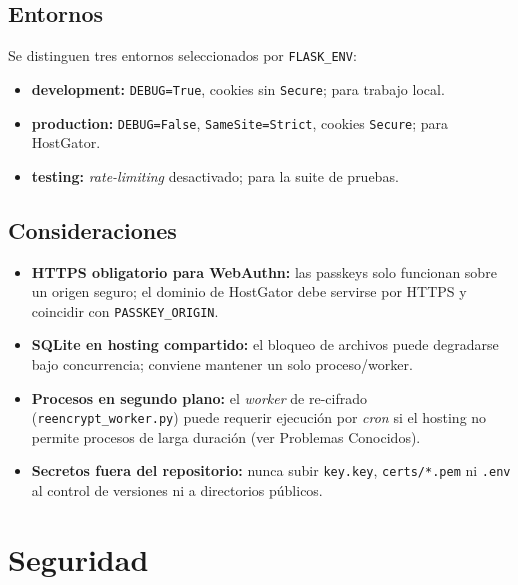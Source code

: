 \documentclass[10pt,letterpaper]{report}
\begin{document}
\section{Entornos}
Se distinguen tres entornos seleccionados por \texttt{FLASK\_ENV}:
\begin{itemize}
  \item \textbf{development:} \texttt{DEBUG=True}, cookies sin \texttt{Secure}; para trabajo local.
  \item \textbf{production:} \texttt{DEBUG=False}, \texttt{SameSite=Strict}, cookies \texttt{Secure};
  para HostGator.
  \item \textbf{testing:} \emph{rate-limiting} desactivado; para la suite de pruebas.
\end{itemize}

\section{Consideraciones}
\begin{itemize}
  \item \textbf{HTTPS obligatorio para WebAuthn:} las passkeys solo funcionan sobre un origen seguro;
  el dominio de HostGator debe servirse por HTTPS y coincidir con \texttt{PASSKEY\_ORIGIN}.
  \item \textbf{SQLite en hosting compartido:} el bloqueo de archivos puede degradarse bajo
  concurrencia; conviene mantener un solo proceso/worker.
  \item \textbf{Procesos en segundo plano:} el \emph{worker} de re-cifrado
  (\texttt{reencrypt\_worker.py}) puede requerir ejecuci\'on por \emph{cron} si el hosting no permite
  procesos de larga duraci\'on (ver Problemas Conocidos).
  \item \textbf{Secretos fuera del repositorio:} nunca subir \texttt{key.key}, \texttt{certs/*.pem} ni
  \texttt{.env} al control de versiones ni a directorios p\'ublicos.
\end{itemize}

\chapter{Seguridad}
\end{document}
